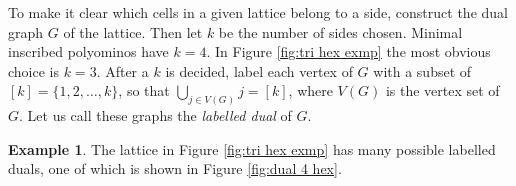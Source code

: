 \documentclass[12pt]{article}
\theoremstyle{plain}
\theoremstyle{definition}
\theoremstyle{remark}
\theoremstyle{definition}
\newtheorem{exmp}{Example}[section]
\newcommand{\lablnode}[3]{\node[shape=circle,draw=white,fill=white, inner sep=0pt,minimum size=1pt] (A) at ( #1 , #2 ) {\{#3\}};}
\begin{document}
To make it clear which cells in a given lattice belong to a side, construct the dual graph $G$ of the lattice. Then let $k$ be the number of sides chosen. Minimal inscribed polyominos have $k=4$. In Figure \ref{fig:tri hex exmp} the most obvious choice is $k=3$. After a $k$ is decided, label each vertex of $G$ with a subset of $[k]=\{1,2,\dots,k \}$, so that $\bigcup_{j \in V(G)} j = [k]$, where $V(G)$ is the vertex set of $G$. Let us call these graphs the \textit{labelled dual} of $G$.

\begin{exmp}
The lattice in Figure \ref{fig:tri hex exmp} has many possible labelled duals, one of which is shown in Figure \ref{fig:dual 4 hex}.

\begin{center}
\label{fig:dual 4 hex}
\end{center}
\end{exmp}
\end{document}
